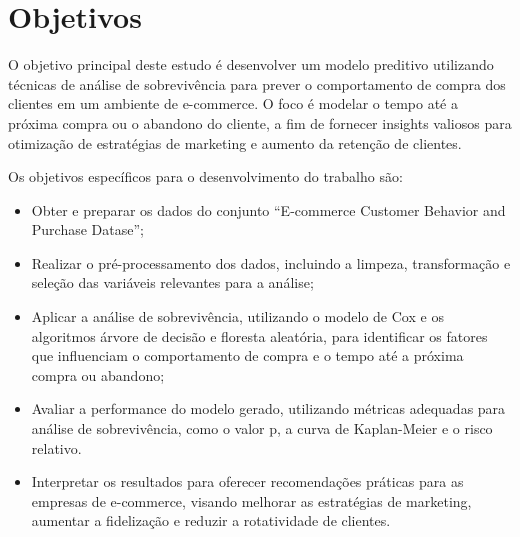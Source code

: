 \section{Objetivos}

O objetivo principal deste estudo é desenvolver um modelo preditivo utilizando técnicas de análise de sobrevivência para prever o comportamento de compra dos clientes em um ambiente de e-commerce. O foco é modelar o tempo até a próxima compra ou o abandono do cliente, a fim de fornecer insights valiosos para otimização de estratégias de marketing e aumento da retenção de clientes.

Os objetivos específicos para o desenvolvimento do trabalho são:
\begin{itemize}
    \item Obter e preparar os dados do conjunto ``E-commerce Customer Behavior and Purchase Datase'';
    \item Realizar o pré-processamento dos dados, incluindo a limpeza, transformação e seleção das variáveis relevantes para a análise;
    \item Aplicar a análise de sobrevivência, utilizando o modelo de Cox e os algoritmos árvore de decisão e floresta aleatória, para identificar os fatores que influenciam o comportamento de compra e o tempo até a próxima compra ou abandono;
    \item Avaliar a performance do modelo gerado, utilizando métricas adequadas para análise de sobrevivência, como o valor p, a curva de Kaplan-Meier e o risco relativo.
    \item Interpretar os resultados para oferecer recomendações práticas para as empresas de e-commerce, visando melhorar as estratégias de marketing, aumentar a fidelização e reduzir a rotatividade de clientes.
\end{itemize}

